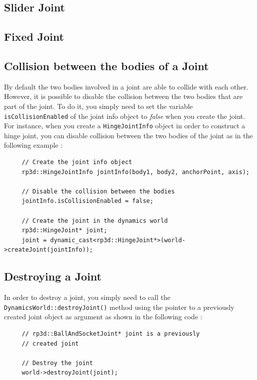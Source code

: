\documentclass[a4paper,12pt]{article}
\begin{document}
    \subsection{Slider Joint}

    \subsection{Fixed Joint}

    \subsection{Collision between the bodies of a Joint}

    By default the two bodies involved in a joint are able to collide with each other. However, it is possible to disable the collision between the two bodies that are part
    of the joint. To do it, you simply need to set the variable \texttt{isCollisionEnabled} of the joint info object to \emph{false} when you create the joint. \\

    For instance, when you create a \texttt{HingeJointInfo} object in order to construct a hinge joint, you can disable collision between the two bodies of the joint as in the
    following example : \\

    \begin{lstlisting}
     // Create the joint info object
     rp3d::HingeJointInfo jointInfo(body1, body2, anchorPoint, axis);

     // Disable the collision between the bodies
     jointInfo.isCollisionEnabled = false;

     // Create the joint in the dynamics world
     rp3d::HingeJoint* joint;
     joint = dynamic_cast<rp3d::HingeJoint*>(world->createJoint(jointInfo));
  \end{lstlisting}

    \subsection{Destroying a Joint}

    In order to destroy a joint, you simply need to call the \texttt{DynamicsWorld::destroyJoint()} method using the pointer to
    a previously created joint object as argument as shown in the following code : \\

    \begin{lstlisting}
     // rp3d::BallAndSocketJoint* joint is a previously
     // created joint

     // Destroy the joint
     world->destroyJoint(joint);
  \end{lstlisting}
\end{document}

